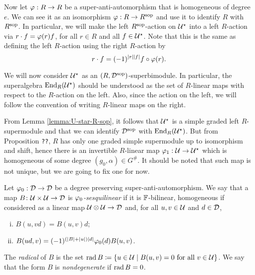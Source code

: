 \documentclass{amsbook}
\begin{document}
Now let $\varphi: R\to R$ be a super-anti-automorphism that is homogeneous of degree $e$.
We can see it as an isomorphism $\varphi: R\to R^{\mathrm{sop}}$ and use it to identify $R$ with $R^{\mathrm{sop}}$. 
In particular, we will make the left $R^{\mathrm{sop}}$-action on $\mathcal U^\star$ into a left $R$-action via $r\cdot f = \varphi(r)f$, for all $r\in R$ and all $f\in \mathcal U^\star$. 
Note that this is the same as defining the left $R$-action using the right $R$-action by
%
\begin{equation}\label{eq:R-action-back-on-the-right}
    r\cdot f = (-1)^{|r||f|} f \circ \varphi(r) .
\end{equation}

We will now consider $\mathcal U^\star$ as an $(R,\mathcal{D}^{\mathrm{sop}})$-superbimodule. 
In particular, the superalgebra $\operatorname{End}_R(\mathcal U^\star)$ should be understood as the set of $R$-linear maps with respect to the $R$-action on the left. 
Also, since the action on the left, we will follow the convention of writing $R$-linear maps on the right.

From Lemma \ref{lemma:U-star-R-sop}, it follows that $\mathcal U^\star$ is a simple graded left $R$-supermodule and that we can identify $\mathcal{D}^{\mathrm{sop}}$ with $\operatorname{End}_R (\mathcal U^\star)$. 
But from Proposition {\tt ??}, $R$ has only one graded simple supermodule up to isomorphism and shift, hence there is an invertible $R$-linear map $\varphi_1: \mathcal U \to \mathcal U^\star$ which is homogeneous of some degree $(g_0, \alpha)\in G^\#$. 
It should be noted that such map is not unique, but we are going to fix one for now. 

\begin{defi}\label{def:sesquilinear-form}
    Let $\varphi_0: \mathcal{D} \to \mathcal{D}$ be a degree preserving su\-per\--an\-ti\--auto\-mor\-phism. We say that a map $B\colon \mathcal U \times \mathcal U \to \mathcal{D}$ is \emph{$\varphi_0$-sesquilinear} if it is $\mathbb{F}$-bilinear, homogeneous if considered as a linear map $\mathcal U\otimes \mathcal U \to \mathcal{D}$ and, for all $u,v \in \mathcal U$ and $d\in \mathcal{D}$,
    \begin{enumerate}[(i)]
        \item $B(u,vd) = B(u,v)d$; \label{enum:linear-on-the-second}
        \item $B(ud, v) = (-1)^ {(|B| + |u|)|d|}\varphi_0(d) B(u, v)$. \label{enum:vphi0-linear-on-the-first}
    \end{enumerate}
    
    The \emph{radical} of $B$ is the set $\operatorname{rad} B \coloneqq \{u\in \mathcal U \mid B(u, v) = 0 \text{ for all } v\in \mathcal U\}$. We say that the form $B$ is \emph{nondegenerate} if $\operatorname{rad} B = 0$.
\end{defi}
\end{document}
